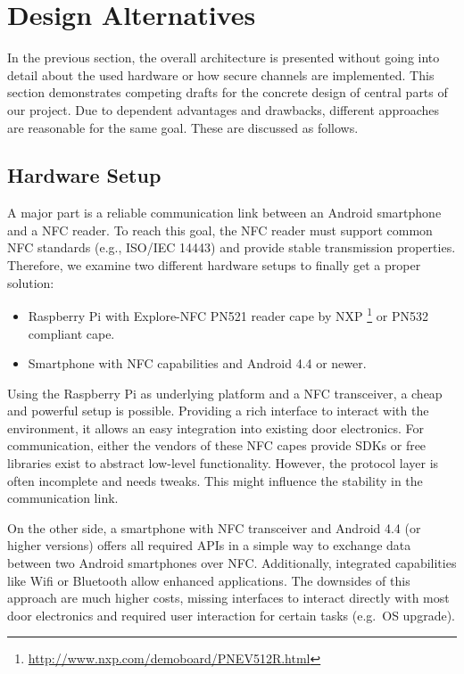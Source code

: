 \section{Design Alternatives}\label{sec:alt}
In the previous section, the overall architecture is presented without going into detail about the used hardware or how secure channels are implemented.
This section demonstrates competing drafts for the concrete design of central parts of our project. 
Due to dependent advantages and drawbacks, different approaches are reasonable for the same goal. These are discussed as follows.


\subsection{Hardware Setup}
A major part is a reliable communication link between an Android smartphone and a NFC reader.
To reach this goal, the NFC reader must support common NFC standards (e.g., ISO/IEC 14443) and provide stable transmission properties.
Therefore, we examine two different hardware setups to finally get a proper solution:
%
\begin{itemize}
	\item Raspberry Pi with Explore-NFC PN521 reader cape by NXP \footnote{\url{http://www.nxp.com/demoboard/PNEV512R.html}} or PN532 compliant cape.
	\item Smartphone with NFC capabilities and Android 4.4 or newer.
\end{itemize}
%
Using the Raspberry Pi as underlying platform and a NFC transceiver, a cheap and powerful setup is possible.
Providing a rich interface to interact with the environment, it allows an easy integration into existing door electronics.
For communication, either the vendors of these NFC capes provide SDKs or free libraries exist to abstract low-level functionality. 
However, the protocol layer is often incomplete and needs tweaks. This might influence the stability in the communication link.

On the other side, a smartphone with NFC transceiver and Android 4.4 (or higher versions) offers all required APIs in a simple way to exchange data between two Android smartphones over NFC.
Additionally, integrated capabilities like Wifi or Bluetooth allow enhanced applications. The downsides of this approach are much higher costs, missing interfaces to interact directly with most door electronics and required user interaction for certain tasks (e.g.~OS upgrade).


